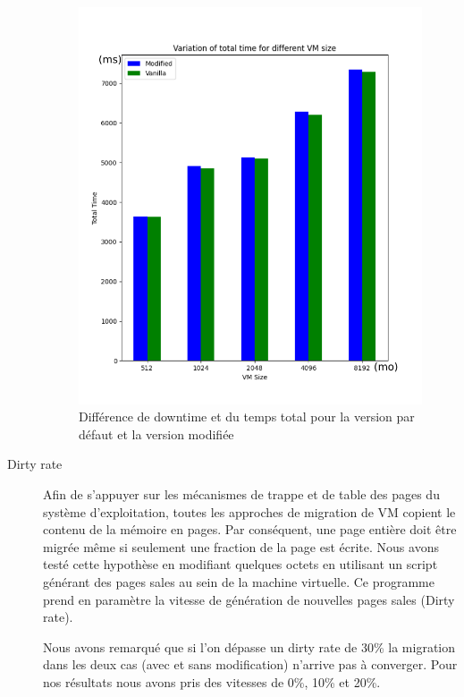 \begin{description}
\begin{figure}[H]
\begin{minipage}{0.48\textwidth}
\includegraphics[width=1\linewidth]{include/total_vmsize.png}
\end{minipage}
\caption{Différence de downtime et du temps total pour la version par défaut et la version modifiée}
\end{figure}

\item[Dirty rate]
Afin de s'appuyer sur les mécanismes de trappe et de table des pages du système d'exploitation, toutes les approches de migration de VM copient le contenu de la mémoire en pages.
Par conséquent, une page entière doit être migrée même si seulement une fraction de la page est écrite.
Nous avons testé cette hypothèse en modifiant quelques octets en utilisant un script générant des pages sales au sein de la machine virtuelle.
Ce programme prend en paramètre la vitesse de génération de nouvelles pages sales (Dirty rate).

Nous avons remarqué que si l'on dépasse un dirty rate de 30\% la migration dans les deux cas (avec et sans modification) n'arrive pas à converger.
Pour nos résultats nous avons pris des vitesses de 0\%, 10\% et 20\%.


\end{description}
